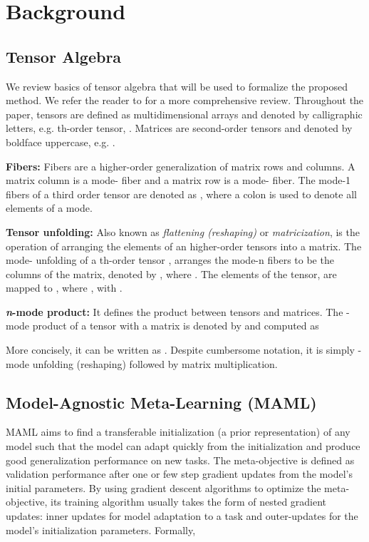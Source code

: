 \documentclass{article}
\begin{document}
\vspace{-2mm}
\section{Background}
\label{background}

\vspace{-2mm}
\subsection{Tensor Algebra}
We review basics of tensor algebra that will be used to formalize the proposed method. We refer the reader to \cite{KoBa09} for a more comprehensive review. Throughout the paper, tensors are defined as multidimensional arrays and denoted by calligraphic letters, e.g. th-order tensor, . Matrices are second-order tensors and denoted by boldface uppercase, e.g. . 


\textbf{Fibers:} Fibers are a higher-order generalization of matrix rows and columns. A matrix column is a mode- fiber and a matrix row is a mode- fiber. The mode-1 fibers of a third order tensor  are denoted as , where a colon is used to denote all elements of a mode.


\textbf{Tensor unfolding:} Also known as \textit{flattening (reshaping)} or \textit{matricization}, is the operation of arranging the elements of an higher-order tensors into a matrix. The mode- unfolding of a th-order tensor , arranges the mode-n fibers to be the columns of the matrix, denoted by , where . The elements of the tensor,  are mapped to , where , with .



\textbf{\textit{n}-mode product:} It defines the product between tensors and matrices. The -mode product of a tensor  with a matrix  is denoted by  and computed as

More concisely, it can be written as . Despite cumbersome notation, it is simply -mode unfolding (reshaping) followed by matrix multiplication.

\vspace{-2mm}
\subsection{Model-Agnostic Meta-Learning (MAML)}
MAML aims to find a transferable initialization (a prior representation) of any model such that the model can adapt quickly from the initialization and produce good generalization performance on new tasks. The meta-objective is defined as validation performance after one or few step gradient updates from the model's initial parameters. By using gradient descent algorithms to optimize the meta-objective, its training algorithm usually takes the form of nested gradient updates: inner updates for model adaptation to a task and outer-updates for the model's initialization parameters. Formally, 
\end{document}
